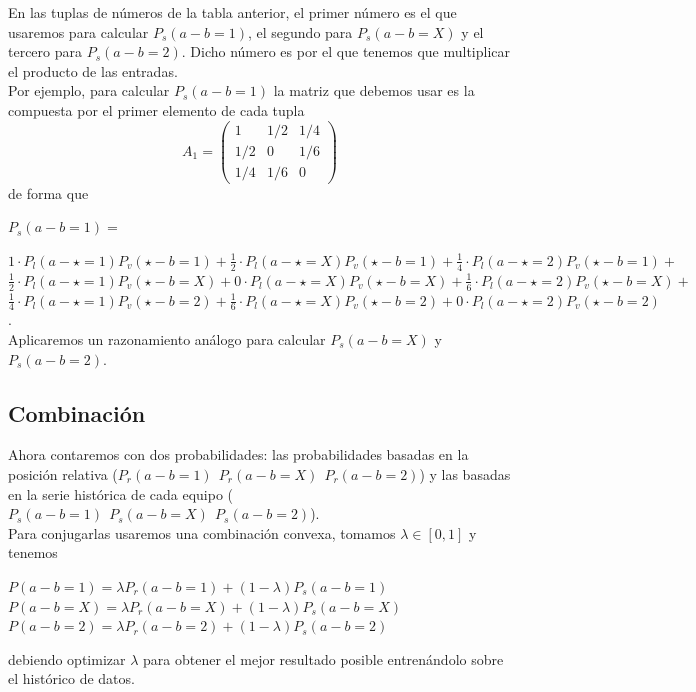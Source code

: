 En las tuplas de números de la tabla anterior, el primer número es el que usaremos para calcular $P_{s}(a-b=1)$, el segundo para $P_{s}(a-b=X)$ y el tercero para $P_{s}(a-b=2)$. Dicho número es por el que tenemos que multiplicar el producto de las entradas.\\

Por ejemplo, para calcular $P_{s}(a-b=1)$ la matriz que debemos usar es la compuesta por el primer elemento de cada tupla\\
\[
A_{1}= \left(\begin{array}{ccc}
1 & 1/2 & 1/4\\
1/2 & 0 & 1/6\\
1/4 & 1/6 & 0
\end{array} \right)
\]
de forma que
	\begin{center}
		$P_{s}(a-b=1)=$
	\end{center}
	$1\cdotp P_{l}(a - \star=1)P_{v}(\star - b=1) + \frac{1}{2}\cdotp P_{l}(a - \star=X)P_{v}(\star - b=1) + \frac{1}{4}\cdotp P_{l}(a - \star=2)P_{v}(\star - b=1)+$\\ 
	$\frac{1}{2}\cdotp P_{l}(a - \star=1)P_{v}(\star - b=X) + 0\cdotp P_{l}(a - \star=X)P_{v}(\star - b=X) + \frac{1}{6}\cdotp P_{l}(a - \star=2)P_{v}(\star - b=X)+$\\
	$\frac{1}{4}\cdotp P_{l}(a - \star=1)P_{v}(\star - b=2) + \frac{1}{6}\cdotp P_{l}(a - \star=X)P_{v}(\star - b=2) + 0\cdotp P_{l}(a - \star=2)P_{v}(\star - b=2)$. \\	

Aplicaremos un razonamiento análogo para calcular $P_{s}(a-b=X)$ y $P_{s}(a-b=2)$.

\subsection{Combinación}
Ahora contaremos con dos probabilidades: las probabilidades basadas en la posición relativa ($P_{r}(a-b=1) \ \ P_{r}(a-b=X) \ \ P_{r}(a-b=2)$) y las basadas en la serie histórica de cada equipo ($P_{s}(a-b=1) \ \ P_{s}(a-b=X) \ \ P_{s}(a-b=2)$).\\

Para conjugarlas usaremos una combinación convexa, tomamos $\lambda \in [0,1]$ y tenemos
\begin{center}
	$ P(a-b=1) = \lambda P_{r}(a-b=1) + (1-\lambda) P_{s}(a-b=1)$\\
	$ P(a-b=X) = \lambda P_{r}(a-b=X) + (1-\lambda) P_{s}(a-b=X)$\\
	$ P(a-b=2) = \lambda P_{r}(a-b=2) + (1-\lambda) P_{s}(a-b=2)$
\end{center}
debiendo optimizar $\lambda$ para obtener el mejor resultado posible entrenándolo sobre el histórico de datos.